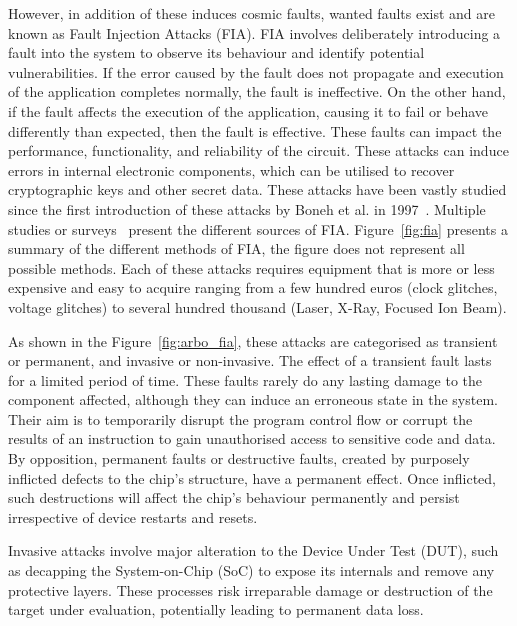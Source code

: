 However, in addition of these induces cosmic faults, wanted faults exist and are known as Fault Injection Attacks (FIA). FIA involves deliberately introducing a fault into the system to observe its behaviour and identify potential vulnerabilities. If the error caused by the fault does not propagate and execution of the application completes normally, the fault is ineffective. On the other hand, if the fault affects the execution of the application, causing it to fail or behave differently than expected, then the fault is effective. These faults can impact the performance, functionality, and reliability of the circuit. These attacks can induce errors in internal electronic components, which can be utilised to recover cryptographic keys and other secret data.
These attacks have been vastly studied since the first introduction of these attacks by Boneh et al. in 1997~\cite{BDL-97-eurocrypt,BDL-01-crypto}. Multiple studies or surveys~\cite{ZAV-06-jarab, BCNTW-06-procieee, CKNDCTD-21-compsec, PBR-15-dtis, YSW-18-hss, BH-22-access} present the different sources of FIA.
Figure~\ref{fig:fia} presents a summary of the different methods of FIA, the figure does not represent all possible methods. Each of these attacks requires equipment that is more or less expensive and easy to acquire ranging from a few hundred euros (clock glitches, voltage glitches) to several hundred thousand (Laser, X-Ray, Focused Ion Beam).

As shown in the Figure~\ref{fig:arbo_fia}, these attacks are categorised as transient or permanent, and invasive or non-invasive.
The effect of a transient fault lasts for a limited period of time. These faults rarely do any lasting damage to the component affected, although they can induce an erroneous state in the system. Their aim is to temporarily disrupt the program control flow or corrupt the results of an instruction to gain unauthorised access to sensitive code and data.
By opposition, permanent faults or destructive faults, created by purposely inflicted defects to the chip’s structure, have a permanent effect. Once inflicted, such destructions will affect the chip’s behaviour permanently and persist irrespective of device restarts and resets.

Invasive attacks involve major alteration to the Device Under Test (DUT), such as decapping the System-on-Chip (SoC) to expose its internals and remove any protective layers. These processes risk irreparable damage or destruction of the target under evaluation, potentially leading to permanent data loss.

